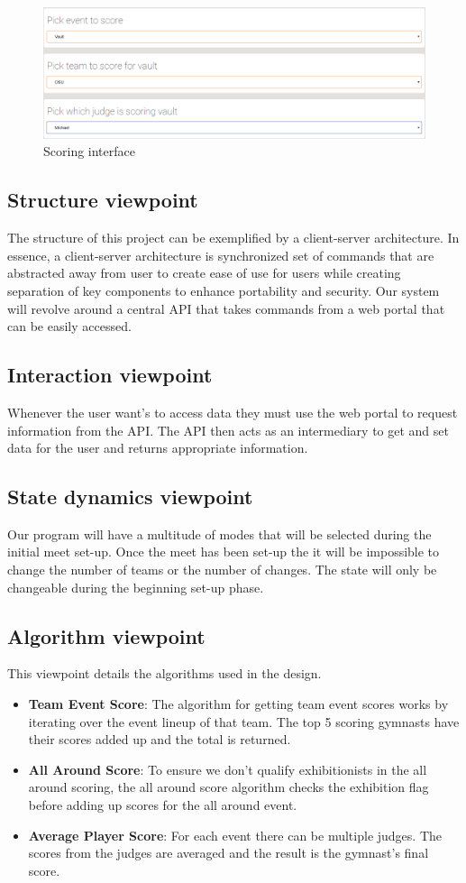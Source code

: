 \documentclass[letterpaper,10pt,draftclsnofoot,onecolumn,]{article}
\begin{document}
\begin{figure}[H]
  \includegraphics[width=\linewidth]{Capture5.png}
  \caption{Scoring interface}
  \label{fig:scoring}
\end{figure}

\subsection{Structure viewpoint}
The structure of this project can be exemplified by a client-server architecture. In essence, a client-server architecture is synchronized set of commands that are abstracted away from user to create ease of use for users while creating separation of key components to enhance portability and security. Our system will revolve around a central API that takes commands from a web portal that can be easily accessed.
\subsection{Interaction viewpoint}
Whenever the user want's to access data they must use the web portal to request information from the API. The API then acts as an intermediary to get and set data for the user and returns appropriate information. 
\subsection{State dynamics viewpoint}
Our program will have a multitude of modes that will be selected during the initial meet set-up. Once the meet has been set-up the it will be impossible to change the number of teams or the number of changes. The state will only be changeable during the beginning set-up phase.
\subsection{Algorithm viewpoint}
This viewpoint details the algorithms used in the design.
\begin{itemize}
    \item \textbf{Team Event Score}: The algorithm for getting team event scores works by iterating over the event lineup of that team. The top 5 scoring gymnasts have their scores added up and the total is returned.
    \item \textbf{All Around Score}: To ensure we don't qualify exhibitionists in the all around scoring, the all around score algorithm checks the exhibition flag before adding up scores for the all around event.
    \item \textbf{Average Player Score}: For each event there can be multiple judges. The scores from the judges are averaged and the result is the gymnast's final score.
\end{itemize}
\end{document}
